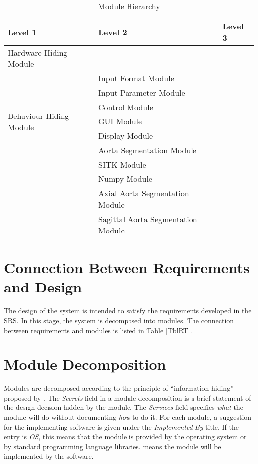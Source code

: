 \documentclass[12pt, titlepage]{article}
\begin{document}
\begin{table}[h!]
\centering
\begin{tabular}{p{} p{}p{}}
\toprule
\textbf{Level 1} & \textbf{Level 2} & \textbf{Level 3}\\
\midrule

{Hardware-Hiding Module} & ~ \\
\midrule

\multirow{7}{0.3\textwidth}{Behaviour-Hiding Module} 
&  Input Format Module & \\
&  Input Parameter Module & \\
& Control Module  & \\
& GUI Module & \\
& Display Module  & \\
& Aorta Segmentation Module & \\
\midrule

\multirow{3}{0.3\textwidth}{Software Decision Module}
& SITK Module \\
& Numpy Module\\
& Axial Aorta Segmentation Module\\
& Sagittal Aorta Segmentation Module\\
\bottomrule

\end{tabular}
\caption{Module Hierarchy}
\label{TblMH}
\end{table}

\section{Connection Between Requirements and Design} \label{SecConnection}

The design of the system is intended to satisfy the requirements developed in
the SRS. In this stage, the system is decomposed into modules. The connection
between requirements and modules is listed in Table \ref{TblRT}.

\section{Module Decomposition} \label{SecMD}

Modules are decomposed according to the principle of ``information hiding''
proposed by \citet{ParnasEtAl1984}. The \emph{Secrets} field in a module
decomposition is a brief statement of the design decision hidden by the
module. The \emph{Services} field specifies \emph{what} the module will do
without documenting \emph{how} to do it. For each module, a suggestion for the
implementing software is given under the \emph{Implemented By} title. If the
entry is \emph{OS}, this means that the module is provided by the operating
system or by standard programming language libraries.  \emph{\progname{}} means the
module will be implemented by the \progname{} software.
\end{document}

